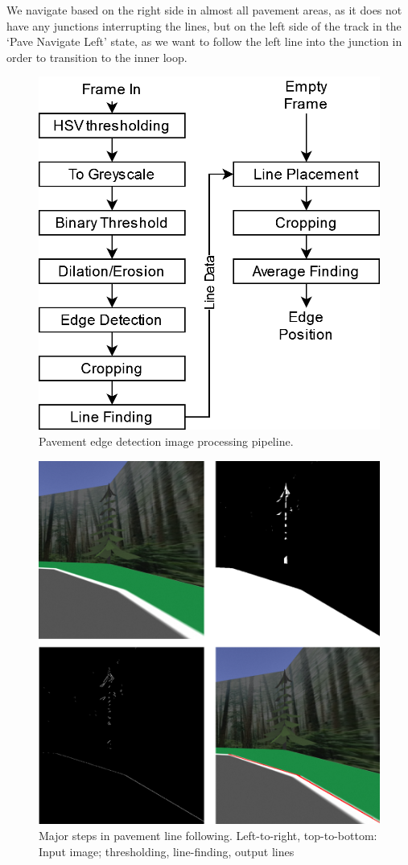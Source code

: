 \documentclass[titlepage, twocolumn]{article}
\begin{document}
            We navigate based on the right side in almost all pavement areas, as it does not have any junctions interrupting the lines, but on the left side of the track in the `Pave Navigate Left' state, as we want to follow the left line into the junction in order to transition to the inner loop. 

            \begin{figure}
                \begin{center}
                    \includegraphics[width=0.6\linewidth]{pavepipeline.png}
                \end{center}
                \caption{Pavement edge detection image processing pipeline.}
                \label{fig:pavepipeline}
            \end{figure}

            \begin{figure}
                \centering
                \includegraphics[width=0.7\linewidth]{lines.png}
                \caption{Major steps in pavement line following. Left-to-right, top-to-bottom: Input image; thresholding, line-finding, output lines}
                \label{fig:pavelinefollow}
            \end{figure}
\end{document}
